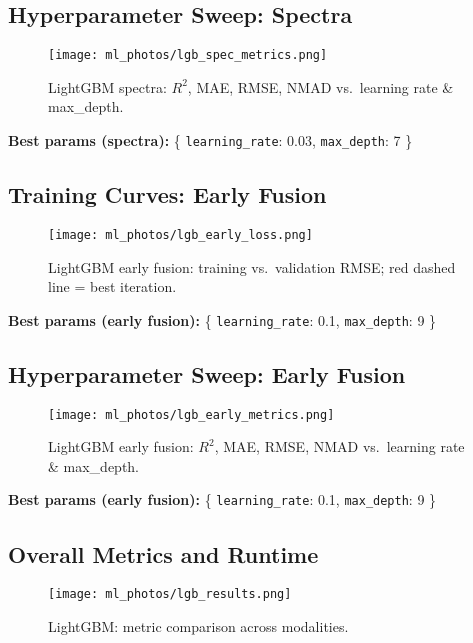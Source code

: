 \documentclass[english,bachelor,oneside]{ctufit-thesis}
\begin{document}
\subsection{Hyperparameter Sweep: Spectra}
\begin{figure}[H]
  \centering
  \texttt{[image: ml\_photos/lgb\_spec\_metrics.png]}
  \caption{LightGBM spectra: $R^2$, MAE, RMSE, NMAD vs.\ learning rate \& max\_depth.}
  \label{fig:lgb_spec_metrics}
\end{figure}
\noindent\textbf{Best params (spectra):} \{ \texttt{learning\_rate}: 0.03, \texttt{max\_depth}: 7 \}\\

\subsection{Training Curves: Early Fusion}
\begin{figure}[H]
  \centering
  \texttt{[image: ml\_photos/lgb\_early\_loss.png]}
  \caption{LightGBM early fusion: training vs.\ validation RMSE; red dashed line = best iteration.}
  \label{fig:lgb_early_loss}
\end{figure}
\noindent\textbf{Best params (early fusion):} \{ \texttt{learning\_rate}: 0.1, \texttt{max\_depth}: 9 \}\\

\subsection{Hyperparameter Sweep: Early Fusion}
\begin{figure}[H]
  \centering
  \texttt{[image: ml\_photos/lgb\_early\_metrics.png]}
  \caption{LightGBM early fusion: $R^2$, MAE, RMSE, NMAD vs.\ learning rate \& max\_depth.}
  \label{fig:lgb_early_metrics}
\end{figure}
\noindent\textbf{Best params (early fusion):} \{ \texttt{learning\_rate}: 0.1, \texttt{max\_depth}: 9 \}\\

\subsection{Overall Metrics and Runtime}
\begin{figure}[H]
  \centering
  \texttt{[image: ml\_photos/lgb\_results.png]}
  \caption{LightGBM: metric comparison across modalities.}
  \label{fig:lgb_results}
\end{figure}
\end{document}
